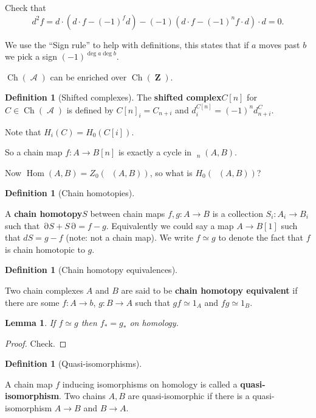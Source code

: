 \documentclass[10pt,]{book}
\newcommand{\terminology}[1]{\textbf{#1}}
\theoremstyle{plain}
\newtheorem{lemma}[theorem]{Lemma}
\theoremstyle{definition}
\newtheorem{definition}[theorem]{Definition}
\numberwithin{equation}{section}
\DeclareMathOperator{\Hom}{Hom}
\DeclareMathOperator{\cHom}{\underline{Hom}}
\DeclareMathOperator{\Ch}{Ch}
\DeclareMathOperator{\cA}{\mathcal{A}}
\DeclareMathOperator{\dd}{\partial}
\DeclareMathOperator{\ZZ}{\mathbf{Z}}
\begin{document}
          Check that \[d^2 f = d\cdot (d\cdot f - (-1)^fd ) - (-1) (d\cdot f - (-1)^n f\cdot d)\cdot d = 0.\]
\par
We use the ``Sign rule'' to help with definitions, this states that if \(a\) moves past \(b\) we pick a sign \((-1)^{\deg a\deg b}\).%
\par
\(\Ch(\cA)\) can be enriched over \(\Ch(\ZZ)\).%
\begin{definition}[Shifted complexes]\label{definition-11}
The \terminology{shifted complex}\(C[n]\) for \(C\in \Ch(\cA)\) is defined by \(C[n]_i = C_{n+i}\) and \(d_i^{C[n]} = (-1)^n d_{n+i}^C\).\end{definition}
\par
Note that \(H_i(C) = H_0(C[i])\).%
\par
So a chain map \(f\colon A \to B[n]\) is exactly a cycle in \(\cHom_n(A,B)\).%
\par
Now \(\Hom(A,B) = Z_0(\cHom(A,B))\), so what is \(H_0(\cHom(A,B))\)?%
\begin{definition}[Chain homotopies]\label{definition-12}

            A \terminology{chain homotopy}\(S\) between chain maps \(f,g\colon A \to B\) is a collection \(S_i \colon A_i \to B_i\) such that \(\dd S + S\dd = f-g\).
            Equivalently we could say a map \(A \to B[1]\) such that \(dS = g -f\) (note: not a chain map).
            We write \(f \simeq g\) to denote the fact that \(f\) is chain homotopic to \(g\).
          \end{definition}
\begin{definition}[Chain homotopy equivalences]\label{definition-13}

            Two chain complexes \(A\) and \(B\) are said to be \terminology{chain homotopy equivalent} if there are some \(f\colon A\to b\), \(g\colon B \to A\) such that \(gf \simeq 1_A\) and \(fg\simeq 1_B\).
          \end{definition}
\begin{lemma}\label{lemma-2}
If \(f\simeq g\) then \(f_* = g_*\) on homology.\end{lemma}
\begin{proof}
Check.\end{proof}
\begin{definition}[Quasi-isomorphisms]\label{definition-14}

            A chain map \(f\) inducing isomorphisms on homology is called a \terminology{quasi-isomorphism}.
            Two chains \(A,B\) are quasi-isomorphic if there is a quasi-isomorphism \(A \to B\) and \(B\to A\).
          \end{definition}
\end{document}
